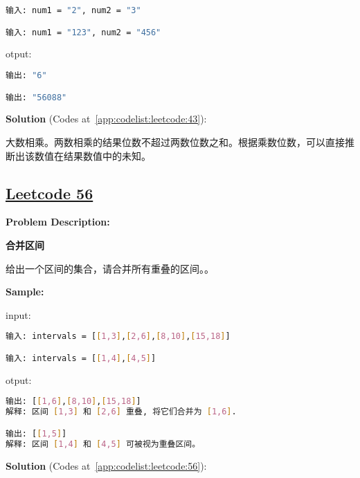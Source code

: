 \begin{lstlisting}[language=bash]
输入: num1 = "2", num2 = "3"

输入: num1 = "123", num2 = "456"
\end{lstlisting}

otput:\par

\begin{lstlisting}[language=bash]
输出: "6"

输出: "56088"
\end{lstlisting}

\textbf{Solution }(Codes at~\ref{app:codelist:leetcode:43}):\par

大数相乘。两数相乘的结果位数不超过两数位数之和。根据乘数位数，可以直接推断出该数值在结果数值中的未知。\par



\subsection{\href{https://leetcode-cn.com/}{Leetcode 56}}\label{app:problemlist:leetcode:56}

\textbf{Problem Description:}\par

\textbf{合并区间}\par

给出一个区间的集合，请合并所有重叠的区间。。\par


\textbf{Sample:}\par

input:\par

\begin{lstlisting}[language=bash]
输入: intervals = [[1,3],[2,6],[8,10],[15,18]]

输入: intervals = [[1,4],[4,5]]
\end{lstlisting}

otput:\par

\begin{lstlisting}[language=bash]
输出: [[1,6],[8,10],[15,18]]
解释: 区间 [1,3] 和 [2,6] 重叠, 将它们合并为 [1,6].

输出: [[1,5]]
解释: 区间 [1,4] 和 [4,5] 可被视为重叠区间。
\end{lstlisting}

\textbf{Solution }(Codes at~\ref{app:codelist:leetcode:56}):\par

